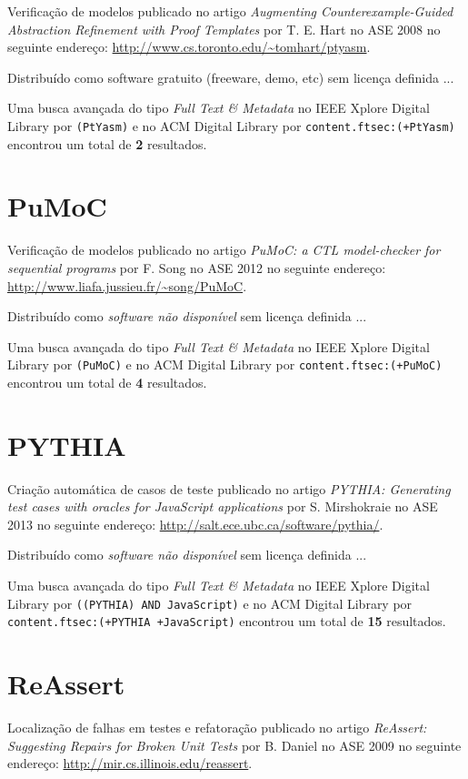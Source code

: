 Verificação de modelos
publicado no artigo
{\it Augmenting Counterexample-Guided Abstraction Refinement with Proof Templates}
por
T. E. Hart
no
ASE
2008
no seguinte endereço:
\url{http://www.cs.toronto.edu/~tomhart/ptyasm}.

Distribuído como software gratuito (freeware, demo, etc)
sem licença definida ...


Uma busca avançada do tipo {\it Full Text \& Metadata} no IEEE Xplore Digital Library por
\texttt{(PtYasm)}
e no ACM Digital Library por
\texttt{content.ftsec:(+PtYasm)}
encontrou um total de
{\bf 2}
resultados.

\section{PuMoC}

Verificação de modelos
publicado no artigo
{\it PuMoC: a CTL model-checker for sequential programs}
por
F. Song
no
ASE
2012
no seguinte endereço:
\url{http://www.liafa.jussieu.fr/~song/PuMoC}.

Distribuído como {\it software não disponível}
sem licença definida ...


Uma busca avançada do tipo {\it Full Text \& Metadata} no IEEE Xplore Digital Library por
\texttt{(PuMoC)}
e no ACM Digital Library por
\texttt{content.ftsec:(+PuMoC)}
encontrou um total de
{\bf 4}
resultados.

\section{PYTHIA}

Criação automática de casos de teste
publicado no artigo
{\it PYTHIA: Generating test cases with oracles for JavaScript applications}
por
S. Mirshokraie
no
ASE
2013
no seguinte endereço:
\url{http://salt.ece.ubc.ca/software/pythia/}.

Distribuído como {\it software não disponível}
sem licença definida ...


Uma busca avançada do tipo {\it Full Text \& Metadata} no IEEE Xplore Digital Library por
\texttt{((PYTHIA) AND JavaScript)}
e no ACM Digital Library por
\texttt{content.ftsec:(+PYTHIA +JavaScript)}
encontrou um total de
{\bf 15}
resultados.

\section{ReAssert}

Localização de falhas em testes e refatoração
publicado no artigo
{\it ReAssert: Suggesting Repairs for Broken Unit Tests}
por
B. Daniel
no
ASE
2009
no seguinte endereço:
\url{http://mir.cs.illinois.edu/reassert}.

